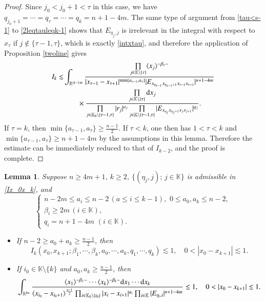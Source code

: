 \documentclass[11pt,reqno]{amsart}
\def\d{{\rm d}}
\newtheorem{lemma}[theorem]{Lemma}
\numberwithin{equation}{section}
\theoremstyle{definition}
\begin{document}
\begin{proof}
	Since $j_0<j_0+1<\tau$ in this case, we have $q_{j_0+1}=\cdots=q_\tau=\cdots=q_k=n+1-4m$. The same type of argument from \eqref{tau<s-1} to \eqref{2leqtauleqk-1} shows that $E_{\eta_j,j}$ is irrelevant in the integral with respect to $x_\tau$ if $j\notin\{\tau-1,\tau\}$, which is exactly \eqref{intxtau}, and therefore the application of Proposition \ref{twoline} gives
	\begin{equation*}\label{I_kcase2est}
		\begin{split}
			I_k\lesssim&\int_{\mathbb{R}^{(k-1)n}}\frac{\prod\limits_{j\in\mathbb{K}\setminus\{\tau\}}\langle x_j\rangle^{-\beta_\tau-}}{|x_{\tau-1}-x_{\tau+1}|^{\min\{a_{\tau-1},a_\tau\}}|E_{x_{\eta_{\tau-1}}x_{\eta_{\tau-1}+1}x_{\tau-1}x_{\tau+1}}|^{n+1-4m}}\\
			&\quad\quad\times\frac{\prod\limits_{j\in\mathbb{K}\setminus\{\tau\}}\d x_j}{\prod\limits_{j\in\mathbb{K}_0\setminus\{\tau-1,\tau\}}|r_j|^{a_j}\prod\limits_{j\in\mathbb{K}\setminus\{\tau-1,\tau\}}|E_{x_{\eta_j}x_{\eta_j+1}x_jx_{j+1}}|^{q_j}}.
		\end{split}
	\end{equation*}
	If $\tau=k$, then $\min\{a_{\tau-1},a_\tau\}\geq\frac{n-1}{2}$. If $\tau<k$, one then has $1<\tau<k$ and $\min\{a_{\tau-1},a_\tau\}\geq n+1-4m$ by the assumptions in this lemma. Therefore the estimate can be immediately reduced to that of $I_{k-2}$, and the proof is complete.
\end{proof}


\begin{lemma}\label{propIkest3}
	Suppose $n\geq4m+1$, $k\geq2$, $\{(\eta_j,j);\,j\in\mathbb{K}\}$ is admissible in \eqref{Ix_0x_k}, and
	\begin{equation*}\label{indexcond3}
		\begin{cases}
			n-2m\leq a_i\leq n-2\,(a\leq i\leq k-1),\,\,0\leq a_0,a_k\leq n-2,\\
			\beta_i\geq2m\,(i\in\mathbb{K}),\\
			q_i=n+1-4m\,\,(i\in\mathbb{K}).
		\end{cases}
	\end{equation*}
	\begin{itemize}
		\item [1)] If $n-2\geq a_0+a_k\geq\frac{n-1}{2}$, then
		\begin{equation*}
			I_k(x_0,x_{k+1};\beta_1,\cdots,\beta_k,a_0,\cdots,a_k,q_1,\cdots,q_k)\lesssim1,\quad0<|x_0-x_{k+1}|\lesssim1.
		\end{equation*}
		
		\item [2)] If $i_0\in\mathbb{K}\setminus\{k\}$ and $a_0,a_k\geq\frac{n-1}{2}$, then
		\begin{equation*}
			\int_{\mathbb{R}^{kn}}\frac{\langle x_1\rangle^{-\beta_1-}\cdots\langle x_k\rangle^{-\beta_k-}\d x_1\cdots \d x_k}{\langle x_{i_0}-x_{i_0+1}\rangle^\frac{n-1}{2}\prod_{i\in\mathbb{K}_0\setminus\{i_0\}}|x_i-x_{i+1}|^{a_i}\prod_{i\in\mathbb{K}}|E_{\eta_i,i}|^{n+1-4m}}\lesssim1,\quad0<|x_0-x_{k+1}|\lesssim1.
		\end{equation*}
	\end{itemize}
\end{lemma}
\end{document}
